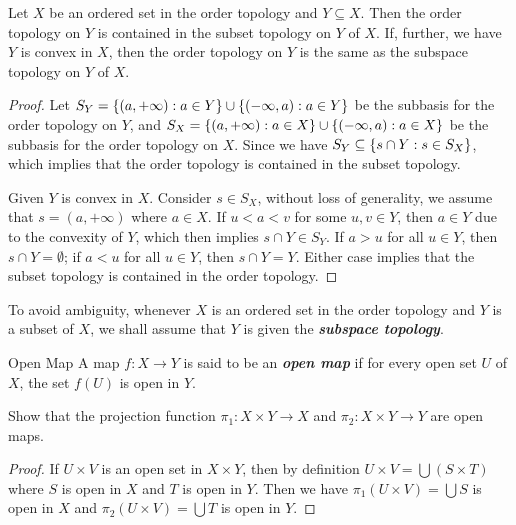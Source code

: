 \documentclass[12pt,a4paper]{article}
\begin{document}
    \begin{thm}
        Let $X$ be an ordered set in the order topology and $Y\subseteq X$. Then the order topology on $Y$ is contained in the subset topology on $Y$ of $X$. If, further, we have $Y$ is convex in $X$, then the order topology on $Y$ is the same as the subspace topology on $Y$ of $X$. 
    \end{thm}
    \begin{proof}
        Let $S_Y=\left\{(a,+\infty):a\in Y\right\}\cup\left\{(-\infty,a):a\in Y\right\}$ be the subbasis for the order topology on $Y$, and $S_X=\left\{(a,+\infty):a\in X\right\}\cup\left\{(-\infty,a):a\in X\right\}$ be the subbasis for the order topology on $X$. Since we have $S_Y\subseteq\left\{s\cap Y:s\in S_X\right\}$, which implies that the order topology is contained in the subset topology.
        \vspace{1em}

        Given $Y$ is convex in $X$. Consider $s\in S_X$, without loss of generality, we assume that $s=(a,+\infty)$ where $a\in X$. If $u<a<v$ for some $u,v\in Y$, then $a\in Y$ due to the convexity of $Y$, which then implies $s\cap Y\in S_Y$. If $a>u$ for all $u\in Y$, then $s\cap Y=\emptyset$; if $a<u$ for all $u\in Y$, then $s\cap Y= Y$. Either case implies that the subset topology is contained in the order topology. 
    \end{proof}
    \hfill

    \begin{note}    
        To avoid ambiguity, whenever $X$ is an ordered set in the order topology and $Y$ is a subset of $X$, we shall assume that $Y$ is given the \textit{\textbf{subspace topology}}.
    \end{note}
    \hfill

    \begin{defi}{Open Map}
        A map $f:X\to Y$ is said to be an \textit{\textbf{open map}} if for every open set $U$ of $X$, the set $f(U)$ is open in $Y$.
    \end{defi}
    
    \begin{ex}
        Show that the projection function $\pi_1:X\times Y\to X$ and $\pi_2:X\times Y\to Y$ are open maps.
    \end{ex}
    \begin{proof}
        If $U\times V$ is an open set in $X\times Y$, then by definition $U\times V=\bigcup(S\times T)$ where $S$ is open in $X$ and $T$ is open in $Y$. Then we have $\pi_1(U\times V)=\bigcup S$ is open in $X$ and $\pi_2(U\times V)=\bigcup T$ is open in $Y$.
    \end{proof}
    \hfill
\end{document}
